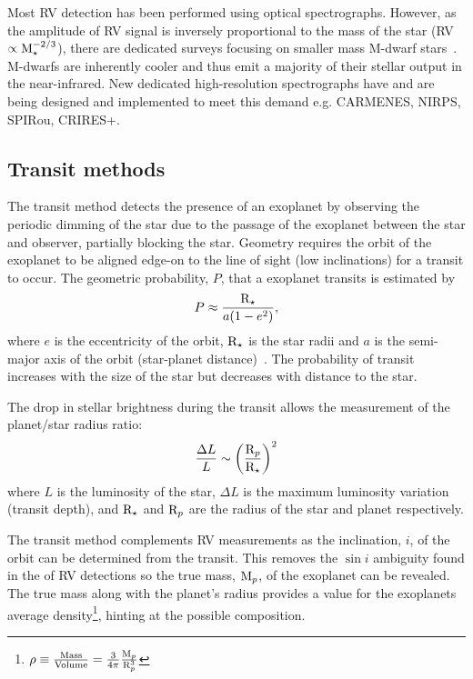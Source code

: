 Most {RV} detection has been performed using optical spectrographs.
However, as the amplitude of {RV} signal is inversely proportional to the mass of the star (RV $\propto \textrm{M}_{\star}^{-2/3}$), there are dedicated surveys focusing on smaller mass M-dwarf stars~\citep[e.g.][]{reiners_carmenes_2018}.
M-dwarfs are inherently cooler and thus emit a majority of their stellar output in the near-infrared. New dedicated high-resolution \nir{} spectrographs have and are being designed and implemented to meet this demand e.g. {CARMENES}, {NIRPS}, {SPIRou}, {CRIRES+}.


\subsection{Transit methods}
\label{subsec:transit}
The transit method detects the presence of an exoplanet by observing the periodic dimming of the star due to the passage of the exoplanet between the star and observer, partially blocking the star.
Geometry requires the orbit of the exoplanet to be aligned edge-on to the line of sight (low inclinations) for a transit to occur.
The geometric probability, $P$, that a exoplanet transits is estimated by
\begin{equation}
P \approx \frac{\textrm{R}_{\star}}{a (1-{e}^{2})},
\end{equation}
where \(e\) is the eccentricity of the orbit, $\textrm{R}_{\star}$ is the star radii and \(a\) is the semi-major axis of the orbit (star-planet distance)~\citep{barnes_effects_2007}.
The probability of transit increases with the size of the star but decreases with distance to the star.

The drop in stellar brightness during the transit allows the measurement of the planet/star radius ratio:
\begin{equation}
    \frac{\Delta L}{L}\sim{\left(\frac{\textrm{R}_{p}}{\textrm{R}_{\star}}\right)}^{2}
\end{equation}
where \(L\) is the luminosity of the star, \(\Delta L\) is the maximum luminosity variation (transit depth), and \(\textrm{R}_{\star}\) and \(\textrm{R}_{p}\) are the radius of the star and planet respectively.

The transit method complements {RV} measurements as the inclination, $i$, of the orbit can be determined from the transit.
This removes the {$\sin{i}$} ambiguity found in the \Mpsini{} of {RV} detections so the true mass, $\textrm{M}_{p}$, of the exoplanet can be revealed.
The true mass along with the planet's radius provides a value for the exoplanets average density\footnote{$\rho \equiv \frac{\textrm{Mass}}{\textrm{Volume}} = \frac{3}{4\pi}\frac{\textrm{M}_{p}}{\textrm{R}_{p}^{3}}$}, hinting at the possible composition.

